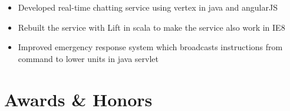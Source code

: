 \documentclass[11pt,a4paper,sans]{moderncv}        %
\begin{document}
{\begin{itemize}%
    \item Developed real-time chatting service using vertex in java and angularJS
    \item Rebuilt the service with Lift in scala to make the service also work in IE8
    \item Improved emergency response system which broadcasts instructions from command to lower units in java servlet
\end{itemize}}

\section{Awards \& Honors}

%


\clearpage
\end{document}
